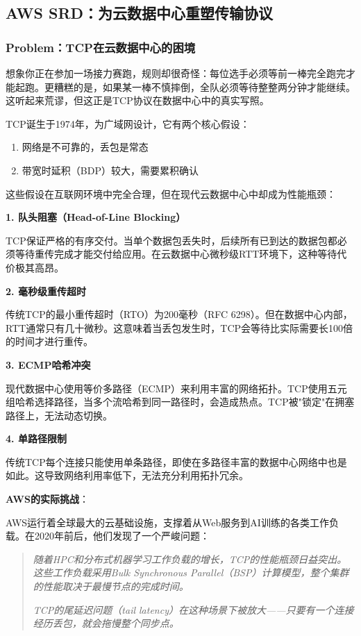 \subsection{AWS SRD：为云数据中心重塑传输协议}

\subsubsection{Problem：TCP在云数据中心的困境}

想象你正在参加一场接力赛跑，规则却很奇怪：每位选手必须等前一棒完全跑完才能起跑。更糟糕的是，如果某一棒不慎摔倒，全队必须等待整整两分钟才能继续。这听起来荒谬，但这正是TCP协议在数据中心中的真实写照。

TCP诞生于1974年，为广域网设计，它有两个核心假设：
\begin{enumerate}
    \item 网络是不可靠的，丢包是常态
    \item 带宽时延积（BDP）较大，需要累积确认
\end{enumerate}

这些假设在互联网环境中完全合理，但在现代云数据中心中却成为性能瓶颈：

\textbf{1. 队头阻塞（Head-of-Line Blocking）}

TCP保证严格的有序交付。当单个数据包丢失时，后续所有已到达的数据包都必须等待重传完成才能交付给应用。在云数据中心微秒级RTT环境下，这种等待代价极其高昂。

\textbf{2. 毫秒级重传超时}

传统TCP的最小重传超时（RTO）为200毫秒（RFC 6298）。但在数据中心内部，RTT通常只有几十微秒。这意味着当丢包发生时，TCP会等待比实际需要长100倍的时间才进行重传。

\textbf{3. ECMP哈希冲突}

现代数据中心使用等价多路径（ECMP）来利用丰富的网络拓扑。TCP使用五元组哈希选择路径，当多个流哈希到同一路径时，会造成热点。TCP被"锁定"在拥塞路径上，无法动态切换。

\textbf{4. 单路径限制}

传统TCP每个连接只能使用单条路径，即使在多路径丰富的数据中心网络中也是如此。这导致网络利用率低下，无法充分利用拓扑冗余。

\textbf{AWS的实际挑战}：

AWS运行着全球最大的云基础设施，支撑着从Web服务到AI训练的各类工作负载。在2020年前后，他们发现了一个严峻问题：

\begin{quote}
\textit{随着HPC和分布式机器学习工作负载的增长，TCP的性能瓶颈日益突出。这些工作负载采用Bulk Synchronous Parallel（BSP）计算模型，整个集群的性能取决于最慢节点的完成时间。}

\textit{TCP的尾延迟问题（tail latency）在这种场景下被放大——只要有一个连接经历丢包，就会拖慢整个同步点。}
\end{quote}

